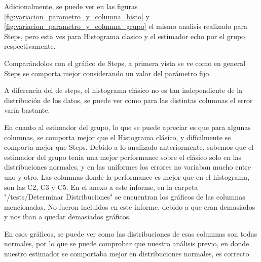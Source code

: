 Adicionalmente, se puede ver en las figuras \ref{fig:variacion_parametro_y_columna_histo} y \ref{fig:variacion_parametro_y_columna_grupo} el mismo analisis realizado para Steps, pero esta ves para Histograma clasico y el estimador echo por el grupo respectivamente.

	Compar\'andolos con el gr\'afico de Steps, a primera vista se ve como en general Steps se comporta mejor considerando un valor del par\'ametro fijo. 
	
	A diferencia del de steps, el histograma cl\'asico no es tan independiente de la distribuci\'on de los datos, se puede ver como para las distintas columnas el error var\'ia bastante. 
	
	En cuanto al estimador del grupo, lo que se puede apreciar es que para algunas columnas, se comporta mejor que el Histograma cl\'asico, y dif\'icilmente se comporta mejor que Steps. Debido a lo analizado anteriormente, sabemos que el estimador del grupo tenia una mejor performance sobre el cl\'asico solo en las distribuciones normales, y en las uniformes los errores no variaban mucho entre uno y otro. Las columnas donde la performance es mejor que en el histograma, son las C2, C3 y C5. En el anexo a este informe, en la carpeta "/tests/Determinar Distribuciones" se encuentran los gr\'aficos de las columnas mencionadas. No fueron incluidos en este informe, debido a que eran demasiados y nos iban a quedar demasiados gr\'aficos.
	
	En esos gr\'aficos, se puede ver como las distribuciones de esas columnas son todas normales, por lo que se puede comprobar que nuestro an\'alisis previo, en donde nuestro estimador se comportaba mejor en distribuciones normales, es correcto.
	